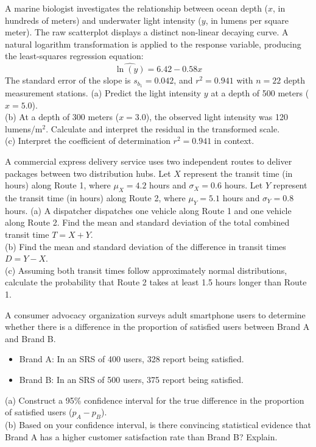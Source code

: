 \begin{workbookbox}
A marine biologist investigates the relationship between ocean depth ($x$, in hundreds of meters) and underwater light intensity ($y$, in lumens per square meter). The raw scatterplot displays a distinct non-linear decaying curve. 
A natural logarithm transformation is applied to the response variable, producing the least-squares regression equation:
\[ \widehat{\ln(y)} = 6.42 - 0.58x \]
The standard error of the slope is $s_{b_1} = 0.042$, and $r^2 = 0.941$ with $n = 22$ depth measurement stations.
(a) Predict the light intensity $y$ at a depth of 500 meters ($x = 5.0$).\\
(b) At a depth of 300 meters ($x = 3.0$), the observed light intensity was 120 lumens/$\text{m}^2$. Calculate and interpret the residual in the transformed scale.\\
(c) Interpret the coefficient of determination $r^2 = 0.941$ in context.
\end{workbookbox}

\begin{workbookbox}
A commercial express delivery service uses two independent routes to deliver packages between two distribution hubs.
Let $X$ represent the transit time (in hours) along Route 1, where $\mu_X = 4.2$ hours and $\sigma_X = 0.6$ hours.
Let $Y$ represent the transit time (in hours) along Route 2, where $\mu_Y = 5.1$ hours and $\sigma_Y = 0.8$ hours.
(a) A dispatcher dispatches one vehicle along Route 1 and one vehicle along Route 2. Find the mean and standard deviation of the total combined transit time $T = X + Y$.\\
(b) Find the mean and standard deviation of the difference in transit times $D = Y - X$.\\
(c) Assuming both transit times follow approximately normal distributions, calculate the probability that Route 2 takes at least 1.5 hours longer than Route 1.
\end{workbookbox}

\begin{workbookbox}
A consumer advocacy organization surveys adult smartphone users to determine whether there is a difference in the proportion of satisfied users between Brand A and Brand B.
\begin{itemize}
  \item Brand A: In an SRS of 400 users, 328 report being satisfied.
  \item Brand B: In an SRS of 500 users, 375 report being satisfied.
\end{itemize}
(a) Construct a 95\% confidence interval for the true difference in the proportion of satisfied users ($p_A - p_B$).\\
(b) Based on your confidence interval, is there convincing statistical evidence that Brand A has a higher customer satisfaction rate than Brand B? Explain.
\end{workbookbox}

